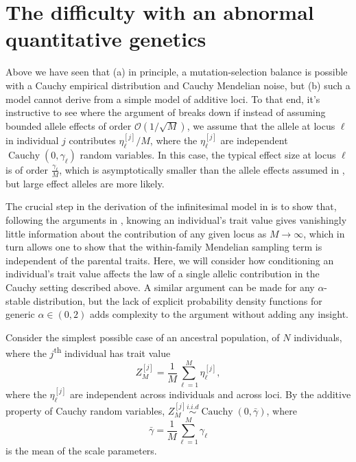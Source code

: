 \documentclass{article}
\newcommand{\iid}{\overset{i.i.d}{\sim}}
\newcommand{\1}{\mathbbm{1}}
\newcommand{\Oh}{{\mathcal O}}
\DeclareMathOperator*{\Cauchy}{Cauchy}
\theoremstyle{remark}
\theoremstyle{definition}
\begin{document}
\section{The difficulty with an abnormal quantitative genetics}
    \label{sec:difficulty}

Above we have seen that
(a) in principle,
a mutation-selection balance is possible with a Cauchy empirical distribution and Cauchy Mendelian noise,
but (b)
such a model cannot derive from a simple model of additive loci.
To that end, it's instructive to see where the argument of \cite{barton2017infinitesimal} breaks down
if instead of assuming bounded allele effects of order $\Oh(1/\sqrt{M})$,
we assume that the allele at locus $\ell$ in individual $j$ contributes
$\eta^{[j]}_{\ell}/M$, where the $\eta^{[j]}_{\ell}$ are independent $\Cauchy(0,\gamma_{\ell})$ random variables. 
In this case, the typical effect size at locus $\ell$ is of order $\frac{\gamma_{\ell}}{M}$,
which is asymptotically smaller than the allele effects assumed in \cite{barton2017infinitesimal},
but large effect alleles are more likely. 

The crucial step in the derivation of the infinitesimal model in \cite{barton2017infinitesimal} is to show that, 
following the arguments in \citet{Fisher1918}, knowing an individual's trait value gives vanishingly little information about the contribution of any given locus as $M \to \infty$, which in turn allows one to show that the within-family Mendelian sampling term is independent of the parental traits. Here, we will consider how conditioning an individual's trait value affects the law of a single allelic contribution in the Cauchy setting described above. A similar argument can be made for any $\alpha$-stable distribution, but the lack of explicit probability density functions for generic $\alpha \in (0,2)$ adds complexity to the argument without adding any insight. 


Consider the simplest possible case of an ancestral population, of $N$ individuals, where the $j$\textsuperscript{th} individual has trait value 
\[
	Z^{[j]}_{M} = \frac{1}{M} \sum_{\ell = 1}^{M}  \eta^{[j]}_{\ell},
\]
where the $\eta^{[j]}_{\ell}$ are independent across individuals and across loci.  By the additive property of Cauchy random variables, $Z^{[j]}_M \iid \Cauchy(0,\bar{\gamma})$, where 
\[
	\bar{\gamma} = \frac{1}{M} \sum_{\ell = 1}^{M} \gamma_{\ell}
\]
is the mean of the scale parameters.  
\end{document}
